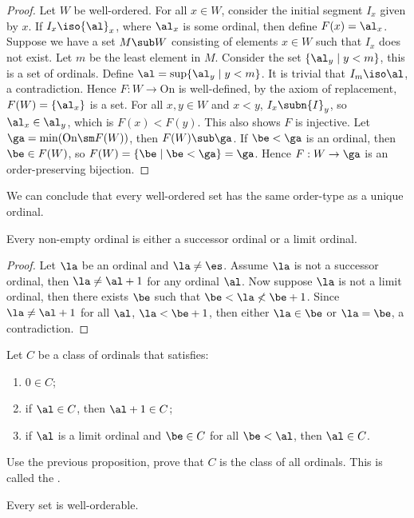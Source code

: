\documentclass[10pt]{article}
\begin{document}
\begin{proof}
    Let $W$ be well-ordered. For all $x\in W$, consider the initial segment ${I}_{x}$ given by $x$. If ${I}_{x}\iso{\al}_{x}$, where ${\al}_{x}$ is some ordinal, then define $F(x)={\al}_{x}$. Suppose we have a set $M\sub W$ consisting of elements $x\in W$ such that ${I}_{x}$ does not exist. Let $m$ be the least element in $M$. Consider the set $\{{\al}_{y}\mid y<m\}$, this is a set of ordinals. Define $\al=\sup\{{\al}_{y}\mid y<m\}$. It is trivial that ${I}_{m}\iso\al$, a contradiction. Hence $F:W\to\text{On}$ is well-defined, by the axiom of replacement, $F(W)=\{{\al}_{x}\}$ is a set. For all $x,y\in W$ and $x<y$, ${I}_{x}\subn{I}_{y}$, so ${\al}_{x}\in{\al}_{y}$, which is $F(x)<F(y)$. This also shows $F$ is injective. Let $\ga=\min(\text{On}\sm F(W))$, then $F(W)\sub\ga$. If $\be<\ga$ is an ordinal, then $\be\in F(W)$, so $F(W)=\{\be\mid\be<\ga\}=\ga$. Hence $F:W\to\ga$ is an order-preserving bijection.
\end{proof}
\par
We can conclude that every well-ordered set has the same order-type as a unique ordinal.
\begin{proposition}
    Every non-empty ordinal is either a successor ordinal or a limit ordinal.
\end{proposition}
\begin{proof}
    Let $\la$ be an ordinal and $\la\ne\es$. Assume $\la$ is not a successor ordinal, then $\la\ne\al+1$ for any ordinal $\al$. Now suppose $\la$ is not a limit ordinal, then there exists $\be$ such that $\be<\la\nless\be+1$. Since $\la\ne\al+1$ for all $\al$, $\la<\be+1$, then either $\la\in\be$ or $\la=\be$, a contradiction.
\end{proof}
\begin{problem}
    Let $C$ be a class of ordinals that satisfies:
    \begin{enumerate}
        \item $0\in C$;
        \item if $\al\in C$, then $\al+1\in C$;
        \item if $\al$ is a limit ordinal and $\be\in C$ for all $\be<\al$, then $\al\in C$.
    \end{enumerate}
    Use the previous proposition, prove that $C$ is the class of all ordinals. This is called the .
\end{problem}
\begin{atheorem}
    Every set is well-orderable.
\end{atheorem}
\end{document}
